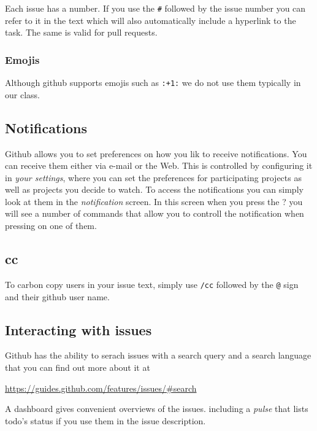 Each issue has a number. If you use the \verb|#| followed by the issue
number you can refer to it in the text which will also automatically
include a hyperlink to the task. The same is valid for pull requests.

\subsubsection{Emojis}

Although github supports emojis such as \verb|:+1:| we do not use them
typically in our class.


\subsection{Notifications}

Github allows you to set preferences on how you lik to receive
notifications. You can receive them either via e-mail or the Web.
This is controlled by configuring it in \textit{your settings}, where
you can set the preferences for participating projects as well as
projects you decide to watch. To access the notifications you can
simply look at them in the \textit{notification} screen. In this screen
when you press the ? you will see a number of commands that allow you
to controll the notification when pressing on one of them.

\subsection{cc}

To carbon copy users in your issue text, simply use \verb|/cc|
followed by the \verb|@| sign and their github user name.


\subsection{Interacting with issues}

Github has the ability to serach issues with a search query and a
search language that you can find out more about it at 

\url{https://guides.github.com/features/issues/#search}

A dashboard gives convenient overviews of the issues. including a {\em
  pulse} that lists todo's status if you use them in the issue
description.





